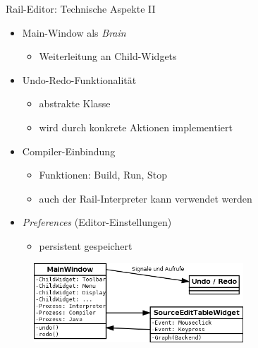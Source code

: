 \begin{frame}{Rail-Editor: Technische Aspekte II}
	\begin{itemize}
		\item Main-Window als \textit{Brain}
		\begin{itemize}
			\item Weiterleitung an Child-Widgets
		\end{itemize}
		\item Undo-Redo-Funktionalität
		\begin{itemize}
			\item abstrakte Klasse
			\item wird durch konkrete Aktionen implementiert
		\end{itemize}
		\item Compiler-Einbindung
		\begin{itemize}
			\item Funktionen: Build, Run, Stop
			\item auch der Rail-Interpreter kann verwendet werden
		\end{itemize}
		\item \textit{Preferences} (Editor-Einstellungen)
		\begin{itemize}
			\item persistent gespeichert
		\end{itemize}
	\end{itemize}
	
	\begin{figure}
		\centering
		\includegraphics[width=0.7\textwidth]{editor-uebersicht}
	\end{figure}
\end{frame}
